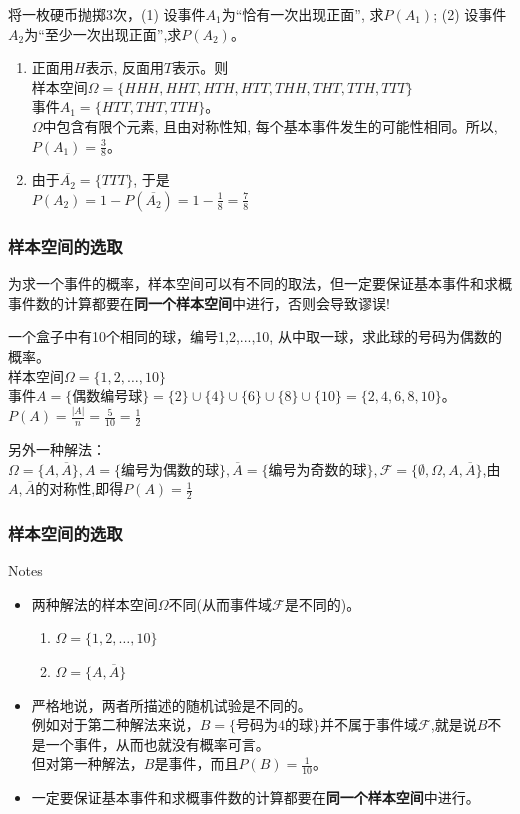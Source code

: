 \begin{frame}
\begin{example}
	将一枚硬币抛掷3次，(1) 设事件$A_1$为``恰有一次出现正面'', 求$P(A_1)$;
	(2) 设事件$A_2$为``至少一次出现正面'',求$P(A_2)$。
	\begin{enumerate}
		\item 正面用$H$表示, 反面用$T$表示。则\\
		样本空间$\Omega=\{HHH,HHT,HTH,HTT,THH,THT,TTH,TTT\}$\\
		事件$A_1=\{HTT,THT,TTH\}$。\\
		$\Omega$中包含有限个元素, 且由对称性知, 每个基本事件发生的可能性相同。所以, $P(A_1)=\frac{3}{8}$。
		\item 由于$\overline{A_2}=\{TTT\}$, 于是\\
		$P(A_2)=1-P(\overline{A_2})=1-\frac{1}{8}=\frac{7}{8}$
	\end{enumerate}
\end{example}
\end{frame}

\begin{frame}
\frametitle{样本空间的选取}
为求一个事件的概率，样本空间可以有不同的取法，但一定要保证基本事件和求概事件数的计算都要在\textbf{同一个样本空间}中进行，否则会导致谬误!
\begin{example}
	一个盒子中有10个相同的球，编号1,2,...,10, 从中取一球，求此球的号码为偶数的概率。\\
	样本空间$\Omega=\{1,2,\dots,10\}$\\
	事件$A=\{\text{偶数编号球} \}=\{2\}\cup\{4\}\cup\{6\}\cup\{8\}\cup\{10\}=\{2,4,6,8,10\}$。\\
	$P(A)=\frac{|A|}{n}=\frac{5}{10}=\frac{1}{2}$
\end{example}
另外一种解法：$\Omega=\{A,\overline{A}\},A=\{\text{编号为偶数的球}\},\overline{A}=\{\text{编号为奇数的球}\},\mathcal{F}=\{\emptyset,\Omega,A,\overline{A}\}$,由$A,\overline{A}$的对称性,即得$P(A)=\frac{1}{2}$

\end{frame}

\begin{frame}
\frametitle{样本空间的选取}
\begin{block}{Notes}
	\begin{itemize}
		\item 两种解法的样本空间$\Omega$不同(从而事件域$\mathcal{F}$是不同的)。
		\begin{enumerate}
			\item $\Omega=\{1,2,\dots,10\}$ 
			\item $\Omega=\{A,\overline{A}\}$
		\end{enumerate}
	   \item 严格地说，两者所描述的随机试验是不同的。\\
	   例如对于第二种解法来说，$B=\{\text{号码为4的球}\}$并不属于事件域$\mathcal{F}$,就是说$B$不是一个事件，从而也就没有概率可言。\\
	   但对第一种解法，$B$是事件，而且$P(B)=\frac{1}{10}$。
	   \item 一定要保证基本事件和求概事件数的计算都要在\textbf{同一个样本空间}中进行。
	\end{itemize}
\end{block}
\end{frame}

